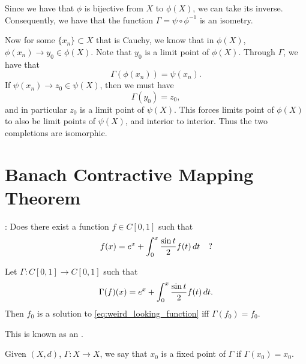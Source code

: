 \documentclass[notoc,notitlepage]{tufte-book}
\begin{document}
Since we have that $\phi$ is bijective from $X$ to $\phi(X)$, we can take its inverse. Consequently, we have that the function $\Gamma = \psi \circ \phi^{-1}$ is an isometry.

Now for some $\{ x_n \} \subset X$ that is Cauchy, we know that in $\phi(X)$, $\phi(x_n) \to y_0 \in \phi(X)$. Note that $y_0$ is a limit point of $\phi(X)$. Through $\Gamma$, we have that
\begin{equation*}
  \Gamma( \phi(x_n) ) = \psi( x_n ).
\end{equation*}
If $\psi(x_n) \to z_0 \in \psi(X)$, then we must have
\begin{equation*}
  \Gamma(y_0) = z_0,
\end{equation*}
and in particular $z_0$ is a limit point of $\psi(X)$. This forces limits point of $\phi(X)$ to also be limit points of $\psi(X)$, and interior to interior. Thus the two completions are isomorphic.


\section{Banach Contractive Mapping Theorem}%
\label{sec:banach_contractive_mapping_theorem}

: Does there exist a function $f \in C[0, 1]$ such that
\begin{equation}\label{eq:weird_looking_function}
  f(x) = e^x + \int_{0}^{x} \frac{\sin t}{2} f(t) \mathop{}\!d{t} \quad ?
\end{equation}

Let $\Gamma : C[0, 1] \to C[0, 1]$ such that
\begin{equation*}
  \Gamma (f) (x) = e^x + \int_{0}^{x} \frac{\sin t}{2} f(t) \mathop{}\!d{t}.
\end{equation*}
Then $f_0$ is a solution to \cref{eq:weird_looking_function} iff $\Gamma(f_0) = f_0$.

This is known as an .

\begin{defn}\label{defn:fixed_point}
  Given $(X, d)$, $\Gamma : X \to X$, we say that $x_0$ is a fixed point of $\Gamma$ if $\Gamma(x_0) = x_0$.
\end{defn}


\end{document}
